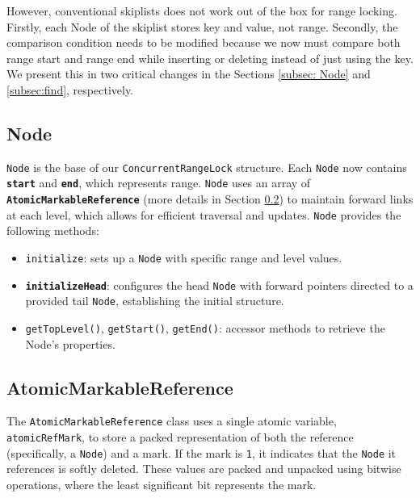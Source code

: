 However, conventional skiplists does not work out of the box for range locking. Firstly, each Node of the skiplist stores key and value, not range. Secondly, the comparison condition needs to be modified because we now must compare both range start and range end while inserting or deleting instead of just using the key. We present this in two critical changes in the Sections \ref{subsec: Node} and \ref{subsec:find}, respectively.

\subsection{Node}\label{subsec:node}

\texttt{Node} is the base of our \texttt{ConcurrentRangeLock} structure.
Each \texttt{Node} now contains \textbf{\texttt{start}} and \textbf{\texttt{end}}, which represents range.
\texttt{Node} uses an array of \textbf{\texttt{AtomicMarkableReference}} (more details in Section \ref{subsec:atomicmarkablereference}) to maintain forward links at each level, which allows for efficient traversal and updates. 
\texttt{Node} provides the following methods:

\begin{itemize}
    \item \texttt{initialize}: sets up a \texttt{Node} with specific range and level values.
    \item \textbf{\texttt{initializeHead}}: configures the head \texttt{Node} with forward pointers directed to a provided tail \texttt{Node}, establishing the initial structure.
    \item \texttt{getTopLevel()}, \texttt{getStart()}, \texttt{getEnd()}: accessor methods to retrieve the Node's properties.
\end{itemize}

\begin{figure}[h]
    \centering
    
\end{figure}

\clearpage

\subsection{AtomicMarkableReference} \label{subsec:atomicmarkablereference}

The \texttt{AtomicMarkableReference} class uses a single atomic variable, \texttt{atomicRefMark}, to store a packed representation of both the reference (specifically, a \texttt{Node}) and a mark. If the mark is \texttt{1}, it indicates that the \texttt{Node} it references is softly deleted. These values are packed and unpacked using bitwise operations, where the least significant bit represents the mark.

